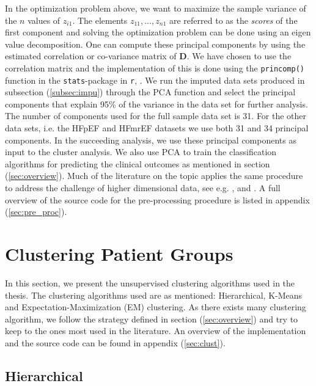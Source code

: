 \documentclass[../thesis.tex]{subfiles}
\begin{document}
\noindent In the optimization problem above, we want to maximize the sample variance of the $n$ values of $z_{i1}$. The elements $z_{11}, \hdots ,z_{n1}$ are referred to as the \textit{scores} of the first component and solving the optimization problem can be done using an eigen value decomposition. One can compute these principal components by using the estimated correlation or co-variance matrix of $\mathbf{D}$. We have chosen to use the correlation matrix and the implementation of this is done using the \texttt{princomp()} function in the \texttt{stats}-package in \texttt{r}, \citep{stats}. We run the imputed data sets produced in subsection (\ref{subsec:impu}) through the PCA function and select the principal components that explain 95\% of the variance in the data set for further analysis. The number of components used for the full sample data set is 31. For the other data sets, i.e. the HFpEF and HFmrEF datasets we use both 31 and 34 principal components. In the succeeding analysis, we use these principal components as input to the cluster analysis. We also use PCA to train the classification algorithms for predicting the clinical outcomes as mentioned in section (\ref{sec:overview}). Much of the literature on the topic applies the same procedure to address the challenge of higher dimensional data, see e.g. \cite{shah2014phenomapping}, \cite{ahmad2014clinical} and \cite{katz2017phenomapping}. A full overview of the source code for the pre-processing procedure is listed in appendix (\ref{sec:pre_proc}).

\section{Clustering Patient Groups}
\label{sec:cluster_pat_gro}

\noindent In this section, we present the unsupervised clustering algorithms used in the thesis. The clustering algorithms used are as mentioned: Hierarchical, K-Means and Expectation-Maximization (EM) clustering. As there exists many clustering algorithm, we follow the strategy defined in section (\ref{sec:overview}) and try to keep to the ones most used in the literature. An overview of the implementation and the source code can be found in appendix (\ref{sec:clust}).

\subsection{Hierarchical}
\label{subsec:hierarchical}
\end{document}
